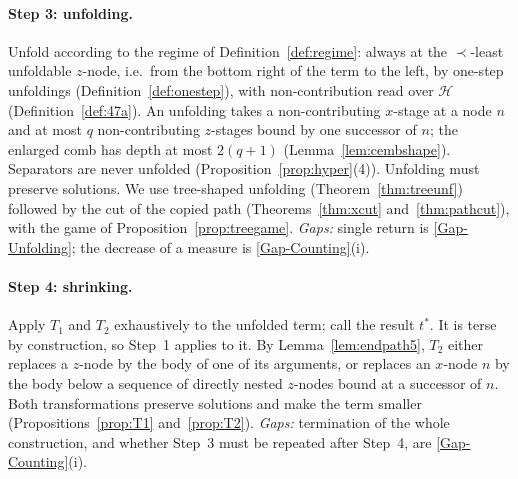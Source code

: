 \documentclass[11pt]{article}
\theoremstyle{plain}
\theoremstyle{definition}
\theoremstyle{remark}
\newcommand{\GapUnfolding}{\hyperref[gap:unfold]{[Gap-Unfolding]}}
\newcommand{\GapCounting}{\hyperref[gap:count]{[Gap-Counting]}}
\begin{document}
\paragraph{Step 3: unfolding.}
Unfold according to the regime of Definition~\ref{def:regime}: always at
the $\prec$-least unfoldable $z$-node, i.e.\ from the bottom right of the
term to the left, by one-step unfoldings (Definition~\ref{def:onestep}),
with non-contribution read over $\mathcal H$ (Definition~\ref{def:47a}).
An unfolding takes a non-contributing $x$-stage at a node $n$ and at most
$q$ non-contributing $z$-stages bound by one successor of $n$; the
enlarged comb has depth at most $2(q+1)$
(Lemma~\ref{lem:cembshape}).  Separators are never unfolded
(Proposition~\ref{prop:hyper}(4)).  Unfolding must preserve solutions.  We use tree-shaped unfolding
(Theorem~\ref{thm:treeunf}) followed by the cut of the copied path
(Theorems~\ref{thm:xcut} and~\ref{thm:pathcut}), with the game of
Proposition~\ref{prop:treegame}.
\emph{Gaps:} single return is \GapUnfolding{}; the decrease of a
measure is \GapCounting{}(i).

\paragraph{Step 4: shrinking.}
Apply $T_1$ and $T_2$ exhaustively to the unfolded term; call the result
$t^*$.  It is terse by construction, so Step~1 applies to it.  By Lemma~\ref{lem:endpath5}, $T_2$ either replaces a $z$-node by
the body of one of its arguments, or replaces an $x$-node $n$ by the body
below a sequence of directly nested $z$-nodes bound at a successor of
$n$.  Both transformations preserve solutions and make the term smaller
(Propositions~\ref{prop:T1} and~\ref{prop:T2}).
\emph{Gaps:} termination of the whole
construction, and whether Step~3 must be repeated after Step~4, are
\GapCounting{}(i).
\end{document}
